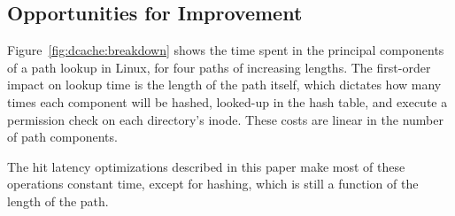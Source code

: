 \subsection{Opportunities for Improvement}

Figure~\ref{fig:dcache:breakdown} shows the time spent in the principal components
of a path lookup in Linux, for four paths of increasing lengths.
The first-order impact on lookup time is the length of the path itself,
which dictates how many times each component will be hashed, looked-up in the 
hash table, and execute a permission check on each directory's inode.
These costs are linear in the number of path components.


The hit latency optimizations described in this paper make most of these 
operations constant time, except for hashing, which is still a function of the 
length of the path.  


